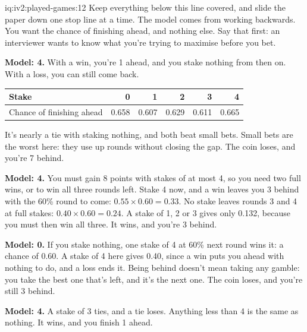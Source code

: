 \begin{solution}{iq:iv2:played-games:12}
Keep everything below this line covered, and slide the paper down one stop line at a time. The model comes from working backwards. You want the chance of finishing ahead, and nothing else. Say that first: an interviewer wants to know what you're trying to maximise before you bet.

\ivstop
\textbf{Model: 4.} With a win, you're 1 ahead, and you stake nothing from then on. With a loss, you can still come back.
\begin{center}\small
\begin{tabular}{@{}l*{5}{r}@{}}
Stake & 0 & 1 & 2 & 3 & 4 \\ \hline
Chance of finishing ahead & 0.658 & 0.607 & 0.629 & 0.611 & 0.665
\end{tabular}
\end{center}
It's nearly a tie with staking nothing, and both beat small bets. Small bets are the worst here: they use up rounds without closing the gap. The coin loses, and you're 7 behind.

\ivstop
\textbf{Model: 4.} You must gain 8 points with stakes of at most 4, so you need two full wins, or to win all three rounds left. Stake 4 now, and a win leaves you 3 behind with the 60\% round to come: $0.55 \times 0.60 = 0.33$. No stake leaves rounds 3 and 4 at full stakes: $0.40 \times 0.60 = 0.24$. A stake of 1, 2 or 3 gives only 0.132, because you must then win all three. It wins, and you're 3 behind.

\ivstop
\textbf{Model: 0.} If you stake nothing, one stake of 4 at 60\% next round wins it: a chance of 0.60. A stake of 4 here gives 0.40, since a win puts you ahead with nothing to do, and a loss ends it. Being behind doesn't mean taking any gamble: you take the best one that's left, and it's the next one. The coin loses, and you're still 3 behind.

\ivstop
\textbf{Model: 4.} A stake of 3 ties, and a tie loses. Anything less than 4 is the same as nothing. It wins, and you finish 1 ahead.


\end{solution}
